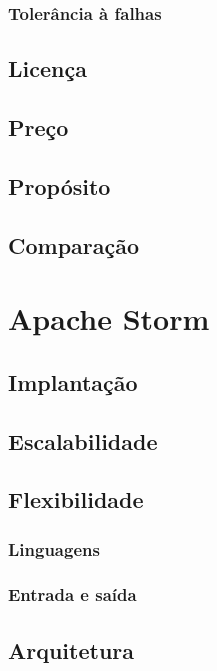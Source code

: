 \subsubsection{Tolerância à falhas}

\subsection{Licença}

\subsection{Preço}

\subsection{Propósito}

\subsection{Comparação}

\section{Apache Storm}

\subsection{Implantação}

\subsection{Escalabilidade}

\subsection{Flexibilidade}

\subsubsection{Linguagens}
\subsubsection{Entrada e saída}

\subsection{Arquitetura}


